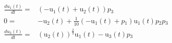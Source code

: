 \begin{align}
\frac{du{_1}(t)}{dt} =& \left(  - \mathrm{u{_1}}\left( t \right) + \mathrm{u{_2}}\left( t \right) \right) p{_3} \\
0 =&  - \mathrm{u{_2}}\left( t \right) + \frac{1}{10} \left(  - \mathrm{u{_1}}\left( t \right) + p{_1} \right) \mathrm{u{_1}}\left( t \right) p{_2} p{_3} \\
\frac{du{_3}(t)}{dt} =& \left( \mathrm{u{_2}}\left( t \right) \right)^{\frac{2}{3}} \mathrm{u{_1}}\left( t \right) - \mathrm{u{_3}}\left( t \right) p{_3}
\end{align}
